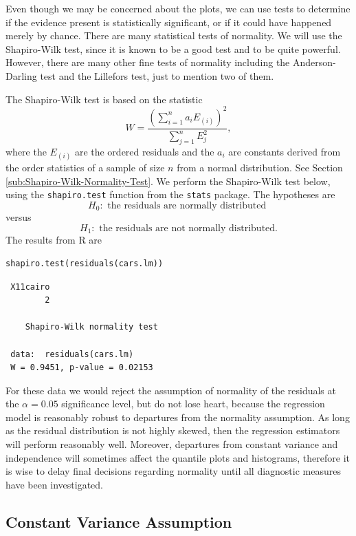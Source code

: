 \documentclass[captions=tableheading]{scrbook}
\begin{document}
Even though we may be concerned about the plots, we can use tests to determine if the evidence present is statistically significant, or if it could have happened merely by chance. There are many statistical tests of normality. We will use the Shapiro-Wilk test, since it is known to be a good test and to be quite powerful. However, there are many other fine tests of normality including the Anderson-Darling test and the Lillefors test, just to mention two of them.  


The Shapiro-Wilk test is based on the statistic
\begin{equation}
W=\frac{\left(\sum_{i=1}^{n}a_{i}E_{(i)}\right)^{2}}{\sum_{j=1}^{n}E_{j}^{2}},
\end{equation}
where the \(E_{(i)}\) are the ordered residuals and the \(a_{i}\) are constants derived from the order statistics of a sample of size \(n\) from a normal distribution. See Section \ref{sub:Shapiro-Wilk-Normality-Test}.
We perform the Shapiro-Wilk test below, using the \texttt{shapiro.test} function from the \texttt{stats} package. The hypotheses are
\[
H_{0}:\mbox{ the residuals are normally distributed }
\]
versus
\[
H_{1}:\mbox{ the residuals are not normally distributed.}
\]
The results from \textsf{R} are


\begin{verbatim}
shapiro.test(residuals(cars.lm))
\end{verbatim}

\begin{verbatim}
 X11cairo 
        2
  
 	Shapiro-Wilk normality test
 
 data:  residuals(cars.lm) 
 W = 0.9451, p-value = 0.02153
\end{verbatim}

For these data we would reject the assumption of normality of the residuals at the \(\alpha=0.05\) significance level, but do not lose heart, because the regression model is reasonably robust to departures from the normality assumption. As long as the residual distribution is not highly skewed, then the regression estimators will perform reasonably well. Moreover, departures from constant variance and independence will sometimes affect the quantile plots and histograms, therefore it is wise to delay final decisions regarding normality until all diagnostic measures have been investigated.
\subsection{Constant Variance Assumption}
\label{sec-11-4-2}
\end{document}
